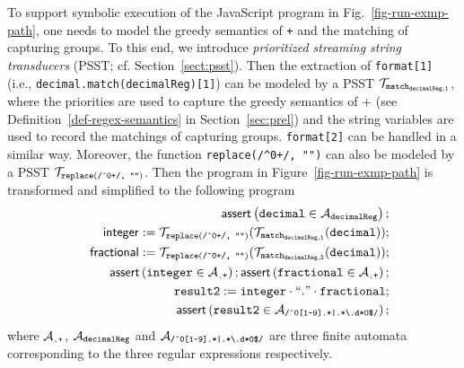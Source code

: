To support symbolic execution of the JavaScript program in Fig.~\ref{fig-run-exmp-path}, one needs to model the greedy semantics of {\tt +} and the matching of capturing groups. To this end, we introduce \emph{prioritized streaming string transducers} (PSST; cf. Section~\ref{sect:psst}). Then the extraction of {\tt format[1]} (i.e., {\tt decimal.match(decimalReg)[1]}) can be modeled by a PSST $\mathcal{T}_{\tt match_{decimalReg,1}}$, where the priorities are used to capture the greedy semantics of $+$ (see Definition~\ref{def-regex-semantics} in Section~\ref{sec:prel}) and the string variables are used to record the matchings of capturing groups. %
{\tt format[2]} can be handled in a similar way. Moreover, the function {\tt replace(/\^{}0+/, "")} can also be modeled by a PSST $\mathcal{T}_{\scriptsize\tt replace(\mbox{\tt /\^{}0+/, ""})}$. Then the program in Figure~\ref{fig-run-exmp-path} is transformed and simplified to the following program
\begin{eqnarray}\label{eqn:exmp}
& & \textsf{assert}\left(\tt decimal \in \mathcal{A}_{decimalReg}\right);\nonumber \\
& & \sf integer  := \tt  \mathcal{T}_{\tt replace(\mbox{\scriptsize \tt /\^{}0+/, ""})}(\mathcal{T}_{\tt match_{decimalReg,1}}(decimal));\nonumber \\
& & \sf fractional  := \tt  \mathcal{T}_{\scriptsize\tt replace(\mbox{\tt /\^{}0+/, ""})}(\mathcal{T}_{\tt match_{decimalReg,2}}(decimal));\nonumber \\
&&  \textsf{assert}\left(\tt integer \in \mathcal{A}_{\scriptsize\mbox{\tt.+}}\right); 
\textsf{assert}\left(\tt fractional \in \mathcal{A}_{\scriptsize\mbox{\tt.+}}\right); \nonumber\\
 && \tt result2 := integer \cdot ``." \cdot fractional; \nonumber\\
 && \textsf{assert}\left(\tt result2 \in \mathcal{A}_{\scriptsize\mbox{\tt /\^{}0[1-9].*|.*{\scriptsize\textbackslash}.d*0\$/}}\right); 
\end{eqnarray}
where $\mathcal{A}_{\scriptsize\mbox{\tt.+}}$, $\mathcal{A}_{\tt decimalReg}$ and $\mathcal{A}_{\scriptsize\mbox{\tt /\^{}0[1-9].*|.*{\scriptsize\textbackslash}.d*0\$/}}$ are three finite automata corresponding to the three regular expressions respectively.

